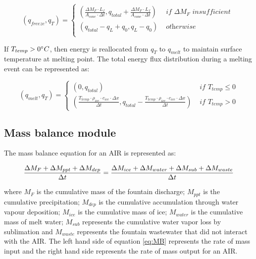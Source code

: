 \begin{equation}
	(q_{freeze}, q_{T}) = \left\{ \begin{array}{ll}
		(\frac{\Delta M_{F} \cdot L_f
		}{A_{cone} \cdot \Delta t}
		, q_{total}+\frac{\Delta M_{F} \cdot L_f
		}{A_{cone} \cdot \Delta t})          & \textit{ if  } \Delta M_{F} \textit{ insufficient } \\
		(q_{total}-q_{L}+q_{0}, q_{L}-q_{0}) & \textit{ otherwise }                                \\
	\end{array} \right.
\end{equation}

If $T_{temp} > 0 ^{\circ} C$, then energy is reallocated from $q_{T}$ to $q_{melt}$ to maintain surface
temperature at melting point. The total energy flux distribution during a melting event can be represented as:

\begin{equation}
	(q_{melt}, q_{T}) = \left\{ \begin{array}{ll}
		(0, q_{total})
		                                                                                                                                                               & \textit{ if } T_{temp} \leq 0 \\
		(\frac{T_{temp} \cdot \rho_{ice} \cdot c_{ice} \cdot \Delta x}{\Delta t}, q_{total}-\frac{T_{temp} \cdot \rho_{ice} \cdot c_{ice} \cdot \Delta x}{\Delta t}  ) & \textit{ if } T_{temp} > 0
	\end{array} \right.
\end{equation}

\subsection{Mass balance module}

The mass balance equation for an AIR is represented as:

\begin{equation}
	\frac{\Delta M_{F} + \Delta M_{ppt} + \Delta M_{dep}}{\Delta t} = \frac{\Delta M_{ice} +\Delta M_{water} +
		\Delta M_{sub} + \Delta M_{waste}}{\Delta t}  \\
	\label{eq:MB}
\end{equation}

where $M_{F}$ is the cumulative mass of the fountain discharge; $M_{ppt}$ is the cumulative precipitation;  $M_{dep}$ is the cumulative
accumulation through water vapour deposition; $M_{ice}$ is the cumulative mass of ice; $M_{water}$ is the cumulative
mass of melt water; $M_{sub}$ represents the cumulative water vapor loss by sublimation and $M_{waste}$ represents the
fountain wastewater that did not interact with the AIR. The left hand side of equation \ref{eq:MB} represents the rate of
mass input and the right hand side represents the rate of mass output for an AIR.

